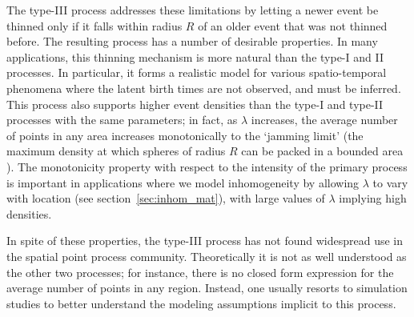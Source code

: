 \documentclass{statsoc}
\begin{document}
The \matern type-III process %
addresses these limitations by letting a newer event be thinned only if 
it falls within radius $R$ of 
an older event that was not thinned before. %
The resulting process has a number of desirable properties. In many applications, this thinning mechanism is 
more natural than the type-I and II processes. %
In particular, it forms a realistic model for various spatio-temporal phenomena where the latent birth times are not observed, and
must be inferred.  This process also supports higher event densities than the type-I and 
type-II processes with the same parameters; in fact, as $\lambda$ increases,
the average number of points in any area increases monotonically to %
the `jamming limit' (the maximum density at which spheres of radius $R$ can be packed in a bounded area \citep{moller10}). %
The monotonicity property with respect to the intensity of the primary process is important in applications where we model inhomogeneity by
allowing $\lambda$ to vary with location (see section~\ref{sec:inhom_mat}), with large values of $\lambda$ implying high densities.

In spite of these properties, the \matern type-III process has not found widespread use in the spatial point process community.
Theoretically it is not as well understood as the other two \matern processes; for instance, there is no closed form 
expression for the average number of points in any region. Instead, one usually resorts to simulation studies to better understand the modeling assumptions
implicit to this process.
\end{document}
